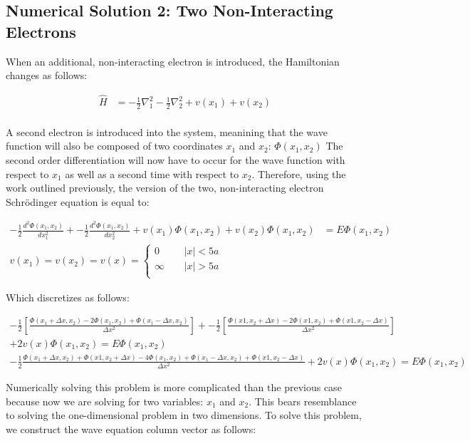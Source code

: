 \documentclass[10pt, oneside, letterpaper]{article}
\begin{document}
\subsection{Numerical Solution 2: Two Non-Interacting Electrons}

When an additional, non-interacting electron is introduced, the Hamiltonian changes as follows:

\begin{align*}
  \hat{H} &= -\frac{1}{2}\nabla^{2}_1 -\frac{1}{2}\nabla^{2}_2 + v(x_1) + v(x_2)\\
\end{align*}

A second electron is introduced into the system, meanining that the wave function will also be composed of two coordinates $x_1$ and $x_2$: $\Phi(x_1, x_2)$ The second order differentiation will now have to occur for the wave function with respect to $x_1$ as well as a second time with respect to $x_2$. Therefore, using the work outlined previously, the version of the two, non-interacting electron Schr\"{o}dinger equation is equal to:

\begin{align*}
  -\frac{1}{2}\frac{d^2\Phi(x_1, x_2)}{dx_1^2} + -\frac{1}{2}\frac{d^2\Phi(x_1, x_2)}{dx_2^2} + v(x_1)\Phi(x_1, x_2) + v(x_2)\Phi(x_1, x_2) &= {E}\Phi(x_1, x_2)
  \\ v(x_1) = v(x_2) = v(x) =
  \begin{cases}
          0       \quad \, & |x| < 5a \\
          \infty  \quad \, & |x| > 5a \\
  \end{cases}
\end{align*}

Which discretizes as follows:

\begin{align*}
  -\frac{1}{2}\left[\frac{\Phi(x_1 + \Delta x, x_2) - 2\Phi(x_1, x_2) + \Phi(x_1 - \Delta x, x_2)}{\Delta x^2}\right] + -\frac{1}{2}\left[\frac{\Phi(x1, x_2 + \Delta x) - 2\Phi(x1, x_2) + \Phi(x1, x_2 - \Delta x)}{\Delta x^2}\right] \\ + 2v(x)\Phi(x_1, x_2) = {E}\Phi(x_1, x_2) \\
  -\frac{1}{2}\frac{\Phi(x_1 + \Delta x, x_2) + \Phi(x1, x_2 + \Delta x) - 4\Phi(x_1, x_2) + \Phi(x_1 - \Delta x, x_2) + \Phi(x1, x_2 - \Delta x)}{\Delta x^2} + 2v(x)\Phi(x_1, x_2) = {E}\Phi(x_1, x_2)
\end{align*}

Numerically solving this problem is more complicated than the previous case because now we are solving for two variables: $x_1$ and $x_2$. This bears resemblance to solving the one-dimensional problem in two dimensions. To solve this problem, we construct the wave equation column vector as follows:
\end{document}

